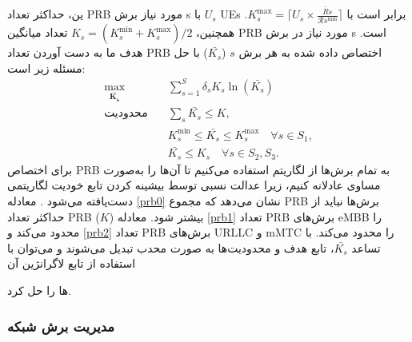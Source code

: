 ین، حداکثر تعداد PRB مورد نیاز برش s با $U_s$ UEs برابر است با $K_s^{\text{max}} = \lceil{U_s \times \frac{\bar{R}s}{\mathcal{R}{{s}}^{\min}}}\rceil$. همچنین، $K_s = (K_s^{\min}+K_s^{\text{max}})/2$ تعداد میانگین PRB مورد نیاز در برش s است.
هدف ما به دست آوردن تعداد PRB اختصاص داده شده به هر برش $s$ ($\bar{K_s}$) با حل مسئله زیر است:
\begin{subequations}\label{prob:prb}
	\begin{alignat}{4}
		\max\limits_{\boldsymbol{\bar{K_s}}} \quad &  \sum_{s=1}^{S}\delta_s K_s \ln(\bar{K_s}) \ \\
		\text{محدودیت} \quad  & \sum_s{\bar{K_s}} \leq K
		\label{prb0}, \\
		& K_s^{\min} \leq \bar{K_s}  \leq K_s^{\text{max}}  \quad \forall s \in S_1,\label{prb1} \\
		&  \bar{K_s} \leq K_s  \quad \forall s \in S_2, S_3.\label{prb2}
	\end{alignat}
	\label{constraints}
\end{subequations}
برای اختصاص PRB به تمام برش‌ها از لگاریتم استفاده می‌کنیم تا آن‌ها را به‌صورت مساوی عادلانه کنیم، زیرا عدالت نسبی توسط بیشینه کردن تابع خودیت لگاریتمی دست‌یافته می‌شود \cite{marabissi2019highly}.
معادله \eqref{prb0} نشان می‌دهد که مجموع PRB برش‌ها نباید از حداکثر تعداد PRB ($K$) بیشتر شود.
معادله \eqref{prb1} تعداد PRB برش‌های eMBB را محدود می‌کند و \eqref{prb2} تعداد PRB برش‌های URLLC و mMTC را محدود می‌کند. با تساعد $\bar{K_s}$، تابع هدف و محدودیت‌ها به صورت محدب تبدیل می‌شوند و می‌توان با استفاده از تابع لاگرانژین آن‌

ها را حل کرد.

\subsubsection{مدیریت برش شبکه}